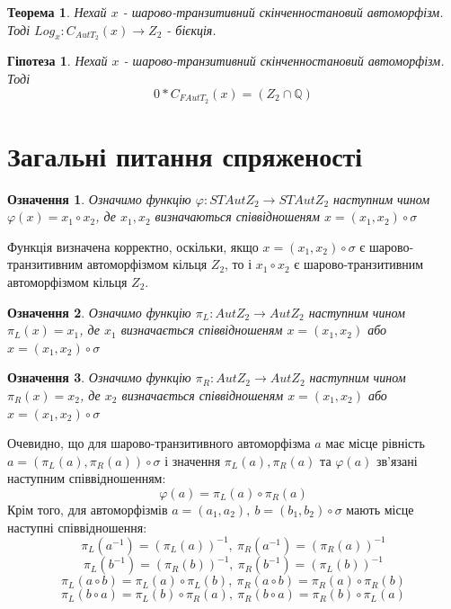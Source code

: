 \documentclass[a4paper,12pt]{article} \usepackage{a4wide}
\numberwithin{equation}{subsection}
\newtheorem{theorem}{Теорема}[subsection]
\newtheorem{definition}{Означення}[subsection]
\newtheorem{hyp}{Гіпотеза}[subsection]
\begin{document}
\begin{theorem} Нехай $x$ - шарово-транзитивний скінченностановий
  автоморфізм. Тоді $Log_x:C_{AutT_2}(x)\rightarrow Z_2$ - бієкція.
\end{theorem}

\begin{hyp} Нехай $x$ - шарово-транзитивний скінченностановий
  автоморфізм. Тоді
 $$0*C_{FAutT_2}(x)=(Z_2 \cap \mathbb{Q})$$
\end{hyp}

\newpage

\section{Загальні питання спряженості}

  \begin{definition}
    Означимо функцію $\varphi :STAutZ_2\rightarrow STAutZ_2$ наступним
    чином $\varphi (x)=x_1\circ x_2$, де $x_1,x_2$ визначаються
    співвідношеням $x=(x_1,x_2)\circ\sigma $
  \end{definition}

  Функція визначена корректно, оскільки, якщо $x=(x_1,x_2)\circ\sigma
  $ є шарово-транзитивним автоморфізмом кільця $Z_2$, то і $x_1\circ
  x_2$ є шарово-транзитивним автоморфізмом кільця $Z_2$.

  \begin{definition}
    Означимо функцію $\pi_L:AutZ_2\rightarrow AutZ_2$ наступним чином
    $\pi_L (x)=x_1$, де $x_1$ визначається співвідношеням
    $x=(x_1,x_2)$ або $x=(x_1,x_2)\circ\sigma $
  \end{definition}

  \begin{definition}
    Означимо функцію $\pi_R:AutZ_2\rightarrow AutZ_2$ наступним чином
    $\pi_R (x)=x_2$, де $x_2$ визначається співвідношеням
    $x=(x_1,x_2)$ або $x=(x_1,x_2)\circ\sigma $
  \end{definition}

  Очевидно, що для шарово-транзитивного автоморфізма $a$ має місце
  рівність $a=(\pi_L(a),\pi_R(a))\circ\sigma$ і значення
  $\pi_L(a),\pi_R(a)$ та $\varphi(a)$ зв'язані наступним
  співвідношенням: $$\varphi(a)=\pi_L(a)\circ \pi_R(a)$$ Крім того,
  для автоморфізмів $a=(a_1,a_2),\ b=(b_1,b_2)\circ \sigma$ мають
  місце наступні співвідношення:
  $$\pi_L(a^{-1})=(\pi_L(a))^{-1},\ \pi_R(a^{-1})=(\pi_R(a))^{-1}$$
  $$\pi_L(b^{-1})=(\pi_R(b))^{-1},\ \pi_R(b^{-1})=(\pi_L(b))^{-1}$$
  $$\pi_L(a\circ b) =\pi_L(a)\circ \pi_L(b),\ \pi_R(a\circ b) =\pi_R(a)\circ \pi_R(b)$$
    $$\pi_L(b\circ a) =\pi_L(b)\circ \pi_R(a),\ \pi_R(b\circ a) =\pi_R(b)\circ \pi_L(a)$$
\end{document}
